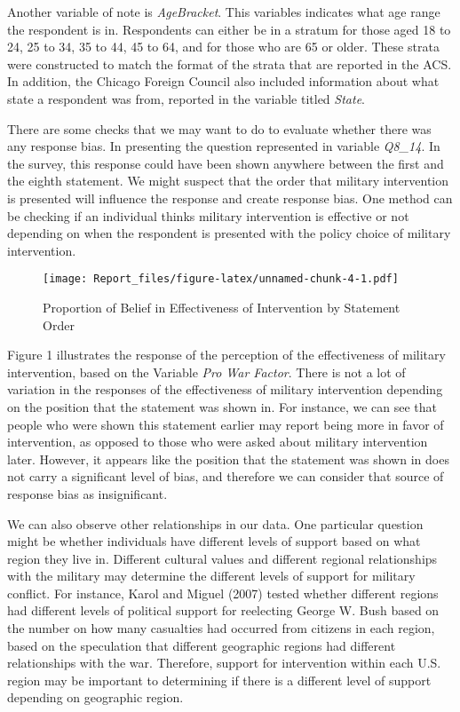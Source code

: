 \documentclass[
  11pt,
]{article}
\begin{document}
Another variable of note is \emph{AgeBracket}. This variables indicates
what age range the respondent is in. Respondents can either be in a
stratum for those aged 18 to 24, 25 to 34, 35 to 44, 45 to 64, and for
those who are 65 or older. These strata were constructed to match the
format of the strata that are reported in the ACS. In addition, the
Chicago Foreign Council also included information about what state a
respondent was from, reported in the variable titled \emph{State}.

There are some checks that we may want to do to evaluate whether there
was any response bias. In presenting the question represented in
variable \emph{Q8\_14}. In the survey, this response could have been
shown anywhere between the first and the eighth statement. We might
suspect that the order that military intervention is presented will
influence the response and create response bias. One method can be
checking if an individual thinks military intervention is effective or
not depending on when the respondent is presented with the policy choice
of military intervention.

\begin{figure}
\centering
\texttt{[image: Report\_files/figure-latex/unnamed-chunk-4-1.pdf]}
\caption{Proportion of Belief in Effectiveness of Intervention by
Statement Order}
\end{figure}

Figure 1 illustrates the response of the perception of the effectiveness
of military intervention, based on the Variable \emph{Pro War Factor}.
There is not a lot of variation in the responses of the effectiveness of
military intervention depending on the position that the statement was
shown in. For instance, we can see that people who were shown this
statement earlier may report being more in favor of intervention, as
opposed to those who were asked about military intervention later.
However, it appears like the position that the statement was shown in
does not carry a significant level of bias, and therefore we can
consider that source of response bias as insignificant.

We can also observe other relationships in our data. One particular
question might be whether individuals have different levels of support
based on what region they live in. Different cultural values and
different regional relationships with the military may determine the
different levels of support for military conflict. For instance, Karol
and Miguel (2007) tested whether different regions had different levels
of political support for reelecting George W. Bush based on the number
on how many casualties had occurred from citizens in each region, based
on the speculation that different geographic regions had different
relationships with the war. Therefore, support for intervention within
each U.S. region may be important to determining if there is a different
level of support depending on geographic region.
\end{document}
